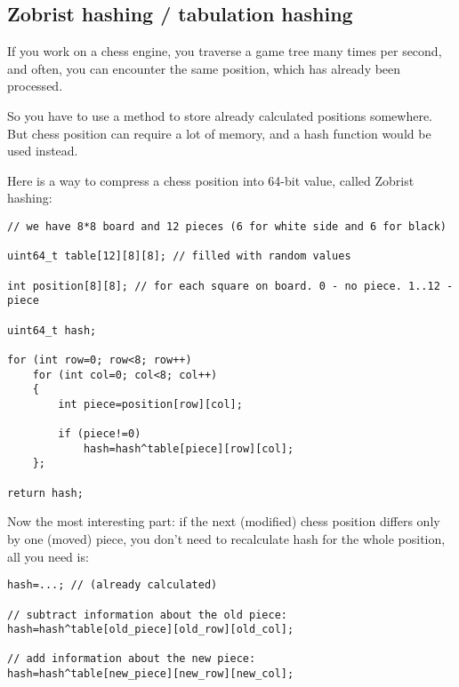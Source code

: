 ﻿\subsection{Zobrist hashing / tabulation hashing}

If you work on a chess engine, you traverse a game tree many times per second, and often, you can encounter
the same position, which has already been processed.

So you have to use a method to store already calculated positions somewhere.
But chess position can require a lot of memory, and a hash function would be used instead.

Here is a way to compress a chess position into 64-bit value, called Zobrist hashing:

\begin{lstlisting}[style=customc]
// we have 8*8 board and 12 pieces (6 for white side and 6 for black)

uint64_t table[12][8][8]; // filled with random values

int position[8][8]; // for each square on board. 0 - no piece. 1..12 - piece

uint64_t hash;

for (int row=0; row<8; row++)
	for (int col=0; col<8; col++)
	{
		int piece=position[row][col];

		if (piece!=0)
			hash=hash^table[piece][row][col];
	};

return hash;
\end{lstlisting}

Now the most interesting part: if the next (modified) chess position differs only by one (moved) piece,
you don't need to recalculate hash for the whole position, all you need is:

\begin{lstlisting}[style=customc]
hash=...; // (already calculated)

// subtract information about the old piece:
hash=hash^table[old_piece][old_row][old_col];

// add information about the new piece:
hash=hash^table[new_piece][new_row][new_col];
\end{lstlisting}
